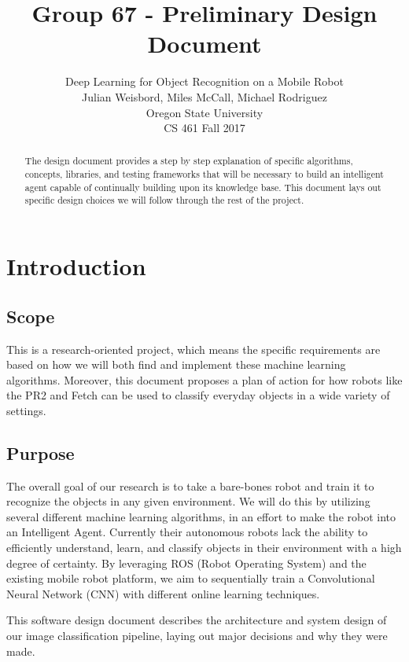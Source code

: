 \documentclass[draftclsnofoot, onecolumn, 10pt, compsoc]{IEEEtran}
\title{Group 67 - Preliminary Design Document}
\author{
            Deep Learning for Object Recognition on a Mobile Robot \\
            Julian Weisbord, Miles McCall, Michael Rodriguez \\
            Oregon State University \\
            CS 461 Fall 2017
		}
\begin{document}
\maketitle

\begin{abstract}
The design document provides a step by step explanation of specific algorithms, concepts, libraries, and testing frameworks that will be necessary to build an intelligent agent capable of continually building upon its knowledge base. This document lays out specific design choices we will follow through the rest of the project. 
\end{abstract}
\newpage

\begin{footnotesize}
\tableofcontents
\end{footnotesize}
\newpage

\newpage
\section{Introduction}

\subsection{Scope}
This is a research-oriented project, which means the specific requirements are based on how we will both find and implement these machine learning algorithms. Moreover, this document proposes a plan of action for how robots like the PR2 and Fetch can be used to classify everyday objects in a wide variety of settings.

\subsection{Purpose}
The overall goal of our research is to take a bare-bones robot and train it to recognize the objects in any given environment. We will do this by utilizing several different machine learning algorithms, in an effort to make the robot into an Intelligent Agent. Currently their autonomous robots lack the ability to efficiently understand, learn, and classify objects in their environment with a high degree of certainty. By leveraging ROS (Robot Operating System) and the existing mobile robot platform, we aim to sequentially train a Convolutional Neural Network (CNN) with different online learning techniques.

This software design document describes the architecture and system design of our image classification pipeline, laying out major decisions and why they were made. 
\end{document}
